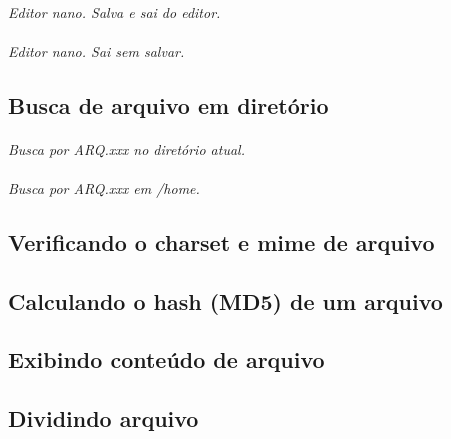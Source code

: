 \documentclass[a4paper,9pt]{extarticle}
\begin{document}
\begin{multicols}{2}
	\paragraph{} \emph{Editor nano. Salva e sai do editor.}
	
	\paragraph{} \emph{Editor nano. Sai sem salvar.}
	
\subsection{Busca de arquivo em diretório}
	
	\paragraph{} \emph{Busca por ARQ.xxx no diretório atual.}
	
	\paragraph{} \emph{Busca por ARQ.xxx em /home.}
	
\subsection{Verificando o charset e mime de arquivo}
	
		
\subsection{Calculando o hash (MD5) de um arquivo}

	\paragraph{}
	
\subsection{Exibindo conteúdo de arquivo}
\subsection{Dividindo arquivo}



\end{multicols}
\end{document}
